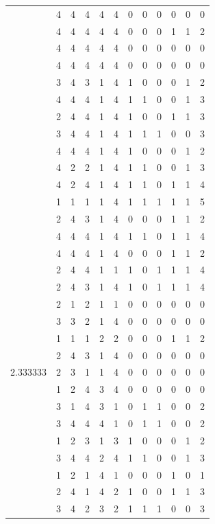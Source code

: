 \documentclass[]{book}
\theoremstyle{definition}
\theoremstyle{definition}
\theoremstyle{definition}
\theoremstyle{remark}
\begin{document}
\begin{table}
{\begin{tabular}[t]{rrrrrrrrrrrr}
 & 4 & 4 & 4 & 4 & 4 & 0 & 0 & 0 & 0 & 0 & 0\\
 & 4 & 4 & 4 & 4 & 4 & 0 & 0 & 0 & 1 & 1 & 2\\
 & 4 & 4 & 4 & 4 & 4 & 0 & 0 & 0 & 0 & 0 & 0\\
 & 4 & 4 & 4 & 4 & 4 & 0 & 0 & 0 & 0 & 0 & 0\\
 & 3 & 4 & 3 & 1 & 4 & 1 & 0 & 0 & 0 & 1 & 2\\
 & 4 & 4 & 4 & 1 & 4 & 1 & 1 & 0 & 0 & 1 & 3\\
 & 2 & 4 & 4 & 1 & 4 & 1 & 0 & 0 & 1 & 1 & 3\\
 & 3 & 4 & 4 & 1 & 4 & 1 & 1 & 1 & 0 & 0 & 3\\
 & 4 & 4 & 4 & 1 & 4 & 1 & 0 & 0 & 0 & 1 & 2\\
 & 4 & 2 & 2 & 1 & 4 & 1 & 1 & 0 & 0 & 1 & 3\\
 & 4 & 2 & 4 & 1 & 4 & 1 & 1 & 0 & 1 & 1 & 4\\
 & 1 & 1 & 1 & 1 & 4 & 1 & 1 & 1 & 1 & 1 & 5\\
 & 2 & 4 & 3 & 1 & 4 & 0 & 0 & 0 & 1 & 1 & 2\\
 & 4 & 4 & 4 & 1 & 4 & 1 & 1 & 0 & 1 & 1 & 4\\
 & 4 & 4 & 4 & 1 & 4 & 0 & 0 & 0 & 1 & 1 & 2\\
 & 2 & 4 & 4 & 1 & 1 & 1 & 0 & 1 & 1 & 1 & 4\\
 & 2 & 4 & 3 & 1 & 4 & 1 & 0 & 1 & 1 & 1 & 4\\
 & 2 & 1 & 2 & 1 & 1 & 0 & 0 & 0 & 0 & 0 & 0\\
 & 3 & 3 & 2 & 1 & 4 & 0 & 0 & 0 & 0 & 0 & 0\\
 & 1 & 1 & 1 & 2 & 2 & 0 & 0 & 0 & 1 & 1 & 2\\
 & 2 & 4 & 3 & 1 & 4 & 0 & 0 & 0 & 0 & 0 & 0\\
2.333333 & 2 & 3 & 1 & 1 & 4 & 0 & 0 & 0 & 0 & 0 & 0\\
 & 1 & 2 & 4 & 3 & 4 & 0 & 0 & 0 & 0 & 0 & 0\\
 & 3 & 1 & 4 & 3 & 1 & 0 & 1 & 1 & 0 & 0 & 2\\
 & 3 & 4 & 4 & 4 & 1 & 0 & 1 & 1 & 0 & 0 & 2\\
 & 1 & 2 & 3 & 1 & 3 & 1 & 0 & 0 & 0 & 1 & 2\\
 & 3 & 4 & 4 & 2 & 4 & 1 & 1 & 0 & 0 & 1 & 3\\
 & 1 & 2 & 1 & 4 & 1 & 0 & 0 & 0 & 1 & 0 & 1\\
 & 2 & 4 & 1 & 4 & 2 & 1 & 0 & 0 & 1 & 1 & 3\\
 & 3 & 4 & 2 & 3 & 2 & 1 & 1 & 1 & 0 & 0 & 3\\

\end{tabular}}
\end{table}
\end{document}
